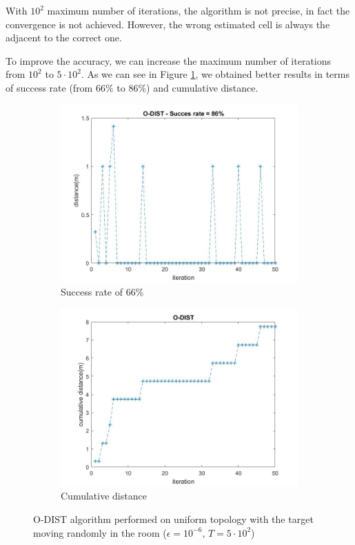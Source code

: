 With $10^2$ maximum number of iterations, the algorithm is not precise, in fact the convergence is not achieved. However, 
the wrong estimated cell is always the adjacent to the correct one.\par 
To improve the accuracy, we can increase the maximum number of iterations from $10^2$ to $5\cdot10^2$. As we can see in 
Figure \ref{fig: target moving randomly 5e2}, we obtained better results in terms of success rate (from $66\%$ to $86\%$) 
and cumulative distance.

\begin{figure}[H]
    \begin{subfigure}{0.45\textwidth}
        \centering
        \includegraphics[width=\textwidth]{img/O-DIST_casual_distance_5e2.jpg}
        \caption{Success rate of 66\%}
    \end{subfigure}
    \hfill
    \begin{subfigure}{0.45\textwidth}
        \centering
        \includegraphics[width=\textwidth]{img/O-DIST_casual_cumdist_5e2.jpg}
        \caption{Cumulative distance}
    \end{subfigure}
    \caption{O-DIST algorithm performed on uniform topology with the target moving randomly in the room ($\epsilon=10^{-6},\,T=5\cdot10^{2}$)}
    \label{fig: target moving randomly 5e2}
\end{figure}